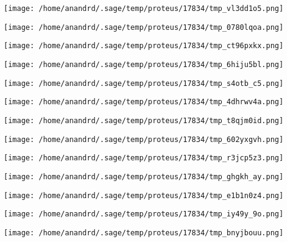 \documentclass[11pt]{article}
\begin{document}
\begin{center}
\texttt{[image: /home/anandrd/.sage/temp/proteus/17834/tmp\_vl3dd1o5.png]}
\end{center}
\begin{center}
\texttt{[image: /home/anandrd/.sage/temp/proteus/17834/tmp\_0780lqoa.png]}
\end{center}
\begin{center}
\texttt{[image: /home/anandrd/.sage/temp/proteus/17834/tmp\_ct96pxkx.png]}
\end{center}
\begin{center}
\texttt{[image: /home/anandrd/.sage/temp/proteus/17834/tmp\_6hiju5bl.png]}
\end{center}
\begin{center}
\texttt{[image: /home/anandrd/.sage/temp/proteus/17834/tmp\_s4otb\_c5.png]}
\end{center}
\begin{center}
\texttt{[image: /home/anandrd/.sage/temp/proteus/17834/tmp\_4dhrwv4a.png]}
\end{center}
\begin{center}
\texttt{[image: /home/anandrd/.sage/temp/proteus/17834/tmp\_t8qjm0id.png]}
\end{center}
\begin{center}
\texttt{[image: /home/anandrd/.sage/temp/proteus/17834/tmp\_602yxgvh.png]}
\end{center}
\begin{center}
\texttt{[image: /home/anandrd/.sage/temp/proteus/17834/tmp\_r3jcp5z3.png]}
\end{center}
\begin{center}
\texttt{[image: /home/anandrd/.sage/temp/proteus/17834/tmp\_ghgkh\_ay.png]}
\end{center}
\begin{center}
\texttt{[image: /home/anandrd/.sage/temp/proteus/17834/tmp\_e1b1n0z4.png]}
\end{center}
\begin{center}
\texttt{[image: /home/anandrd/.sage/temp/proteus/17834/tmp\_iy49y\_9o.png]}
\end{center}
\begin{center}
\texttt{[image: /home/anandrd/.sage/temp/proteus/17834/tmp\_bnyjbouu.png]}
\end{center}
\end{document}
